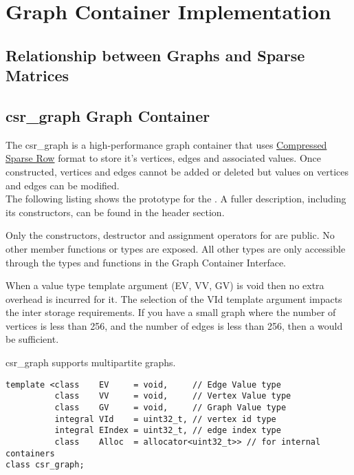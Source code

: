 
\chapter{Graph Container Implementation}



\section{Relationship between Graphs and Sparse Matrices}


\section{csr\_graph Graph Container}
The csr\_graph is a high-performance graph container that uses \href{https://en.wikipedia.org/wiki/Sparse_matrix#Compressed_sparse_row_\%28CSR\%2C_CRS_or_Yale_format\%29}{Compressed Sparse Row} format to store it's vertices, edges and associated values. Once constructed, vertices and edges cannot be added or deleted but values on vertices and edges can be modified.
\\

The following listing shows the prototype for the . A fuller description, including its constructors, can be found in the  header section.

Only the constructors, destructor and assignment operators for  are public. No other member functions or types are exposed. All other types are only accessible through the types and functions in the Graph Container Interface.

When a value type template argument (EV, VV, GV) is void then no extra overhead is incurred for it. The selection of the VId template argument impacts the inter storage requirements. If you have a small graph where the number of vertices is less than 256, and the number of edges is less than 256, then a  would be sufficient.

csr\_graph supports multipartite graphs.

\begin{lstlisting}
template <class    EV     = void,     // Edge Value type
          class    VV     = void,     // Vertex Value type
          class    GV     = void,     // Graph Value type
          integral VId    = uint32_t, // vertex id type
          integral EIndex = uint32_t, // edge index type
          class    Alloc  = allocator<uint32_t>> // for internal containers
class csr_graph;
\end{lstlisting}

